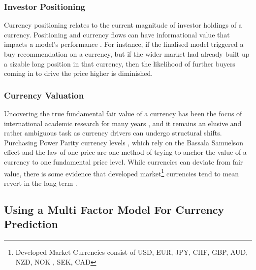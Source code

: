 \documentclass[11pt, a4paper]{article}
\begin{document}
\subsubsection{Investor Positioning}
Currency positioning relates to the current magnitude of investor holdings of a currency. Positioning and currency flows can have informational value that impacts a model's performance \cite{Menkhoff2012}. For instance, if the finalised model triggered a buy recommendation on a currency, but if the wider market had already built up a sizable long position in that currency, then the likelihood of further buyers coming in to drive the price higher is diminished.
\subsubsection{Currency Valuation}
Uncovering the true fundamental fair value of a currency has been the focus of international academic research for many years \cite{Rogoff1996}, and it remains an elusive and rather ambiguous task as currency drivers can undergo structural shifts. Purchasing Power Parity currency levels  , which rely on the Bassala Samuelson effect and the law of one price \cite{Hassan2016} are one method of trying to anchor the value of a currency to one fundamental price level. While currencies can deviate from fair value, there is some evidence that developed market\footnote{Developed Market Currencies consist of USD, EUR, JPY, CHF, GBP, AUD, NZD, NOK , SEK, CAD} currencies tend to mean revert in the long term \cite{CaZorzi2016}.


\subsection{Using a Multi Factor Model For Currency Prediction}
\end{document}
